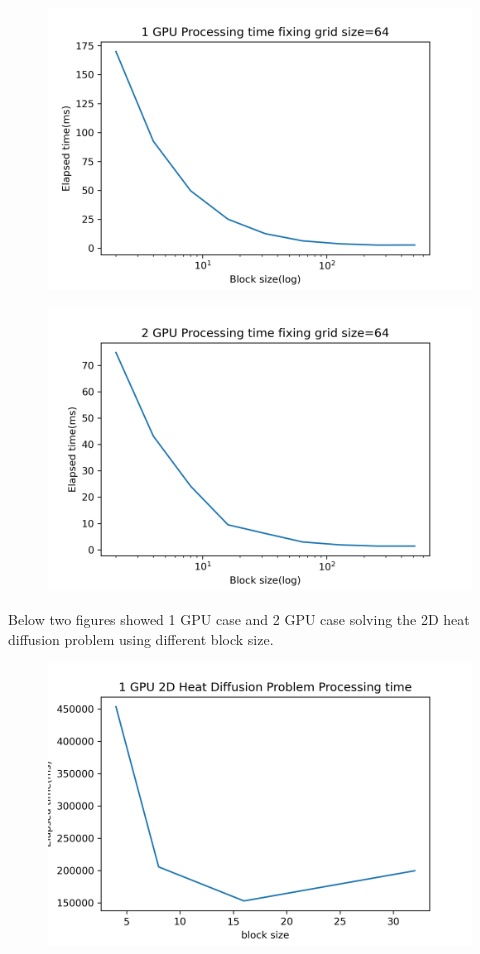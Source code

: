 \documentclass{article}
\begin{document}
	\begin{figure}
		\centering
		\includegraphics[width=\linewidth]{notebook/1gpu_processing_time_fix_grid}
	\end{figure}
	\begin{figure}[hb!]
		\centering
		\includegraphics[width=\linewidth]{notebook/2gpu_processing_time_fix_grid}
	\end{figure}
	Below two figures showed 1 GPU case and 2 GPU case solving the 2D heat diffusion problem using different block size.
	\newpage
	\begin{figure}
		\centering
		\includegraphics[width=\linewidth]{notebook/1gpu_heat_diffusion_processing_time}
	\end{figure}
\end{document}
